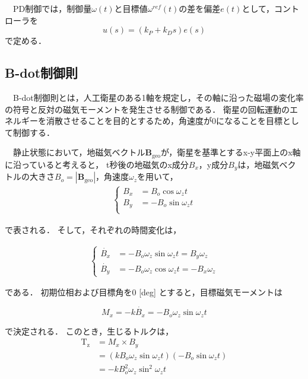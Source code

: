 　PD制御では，制御量$\omega(t)$と目標値$\omega^{ref}(t)$の差を偏差$e(t)$として，コントローラを
\begin{equation}
    u(s) = (k_P+k_Ds)e(s)
\end{equation}
で定める．


\newpage
\subsection{B-dot制御則}
　B-dot制御則とは，人工衛星のある1軸を規定し，その軸に沿った磁場の変化率の符号と反対の磁気モーメントを発生させる制御である．
衛星の回転運動のエネルギーを消散させることを目的とするため，角速度が0になることを目標として制御する．

　静止状態において，地磁気ベクトル$\boldsymbol{B}_\mathrm{geo}$が，衛星を基準とするx-y平面上のx軸に沿っていると考えると，
t秒後の地磁気のx成分$B_x$，y成分$B_y$は，地磁気ベクトルの大きさ$B_o=|\boldsymbol{B}_\mathrm{geo}|$，角速度$\omega_z$を用いて，
\begin{align}
    \left\{
        \begin{aligned}
            B_x &= B_o\cos\omega_zt\\
            B_y &= -B_o\sin\omega_zt\\
        \end{aligned}                    
    \right.
\end{align}

で表される．
そして，それぞれの時間変化は，

\begin{align}
    \left\{
        \begin{aligned}
            \dot{B_x} &= -B_o\omega_z\sin\omega_zt = B_y\omega_z\\
            \dot{B_y} &= -B_o\omega_z\cos\omega_zt = -B_x\omega_z
        \end{aligned}                    
    \right.
\end{align}

である．
初期位相および目標角を0 [deg] とすると，目標磁気モーメントは

\begin{equation}
    M_x = -k\dot{B_x} = -B_o\omega_z\sin\omega_zt
\end{equation}

で決定される．
このとき，生じるトルクは，
\begin{equation}
    \begin{aligned}
        \mathrm{T_z} &= M_x \times B_y\\
                     &= (kB_o\omega_z\sin\omega_zt)(-B_o\sin\omega_zt)\\
                     &= -kB_o^2\omega_z\sin^2\omega_zt
    \end{aligned}
\end{equation}

